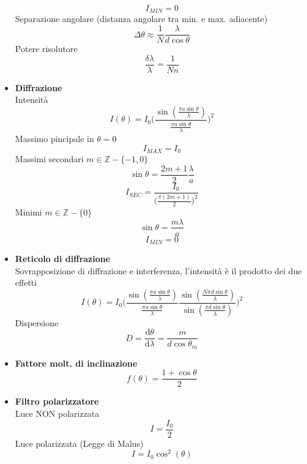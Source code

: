 \documentclass{book}
\newcommand{\g}{\textbf}
\newcommand{\e}{\begin{equation}}
\newcommand{\ex}{\end{equation} }
\renewcommand{\it}{\item[$\cdot$]}
\begin{document}
\begin{multicols}{4}
\begin{itemize}
        \e{I_{MIN}=0}\ex
        Separazione angolare (distanza angolare tra min. e max. adiacente)
        \e{\Delta\theta\approx\frac{1}{N}\frac{\lambda}{d \cos \theta}}\ex
        Potere risolutore
        \e{\frac{\delta\lambda}{\lambda}=\frac{1}{Nn}}\ex
    \it \g{Diffrazione} \\
        Intensità
        \e{I(\theta)=I_{0}\biggl(\frac{\sin(\frac{\pi a \sin\theta}{\lambda})}{\frac{\pi a \sin\theta}{\lambda}} \biggr)^2} \ex
        Massimo pincipale in $\theta=0$ \\
        \e{I_{MAX}=I_0} \ex
        Massimi secondari $m\in\mathbb{Z}-\{-1,0\}$
        \e{\sin\theta=\frac{2m+1}{2}\frac{\lambda}{a}} \ex
        \e{I_{SEC}=\frac{I_0}{\bigl( \frac{\pi(2m+1)}{2} \bigr)^2}} \ex
        Minimi $m\in\mathbb{Z}-\{0\}$
        \e{\sin\theta=\frac{m\lambda}{a}}\ex
        \e{I_{MIN}=0}\ex
    \it \g{Reticolo di diffrazione} \\
        Sovrapposizione di diffrazione e interferenza, l'intensità è il prodotto dei due effetti \\
        \e{I(\theta)=I_0 \biggl( \frac{\sin(\frac{\pi a \sin\theta}{\lambda})}{\frac{\pi a \sin\theta}{\lambda}} 
        \frac{\sin(\frac{N\pi d \sin\theta}{\lambda})}{\sin(\frac{\pi d \sin\theta}{\lambda})}   \biggr)^2}\ex
        Dispersione
        \e{D=\frac{\mathrm{d}\theta}{\mathrm{d}\lambda}=\frac{m}{d\cos\theta_m}}\ex
    \it \g{Fattore molt. di inclinazione}
        \e{f(\theta)=\frac{1+\cos{\theta}}{2}}\ex
    \it \g{Filtro polarizzatore} \\
        Luce NON polarizzata
        \e{I=\frac{I_0}{2}}\ex
        Luce polarizzata (Legge di Malus)
        \e{I=I_0\cos^2(\theta)}\ex
\end{itemize}
\end{multicols}
\end{document}
